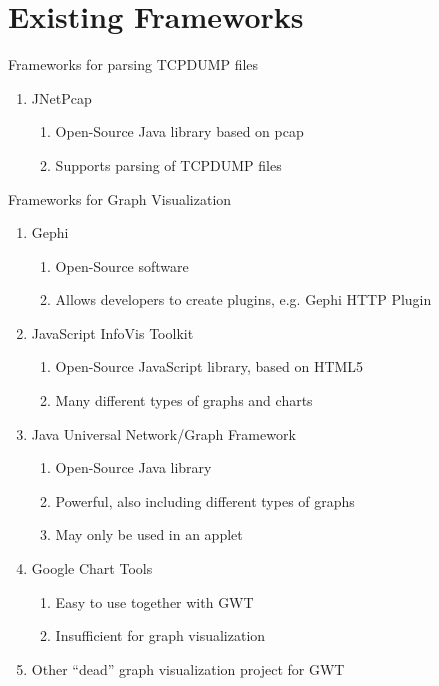 \documentclass{beamer}
\begin{document}
\section{Existing Frameworks}

\begin{frame}{Frameworks for parsing TCPDUMP files }
  \begin{enumerate}
   \item JNetPcap 
      \begin{enumerate}
	\item Open-Source Java library based on pcap
	\item Supports parsing of TCPDUMP files
      \end{enumerate}  
  \end{enumerate}
\end{frame}


\begin{frame}{Frameworks for Graph Visualization}

  \begin{enumerate}
    \item Gephi
      \begin{enumerate}
	\item Open-Source software
	\item Allows developers to create plugins, e.g. Gephi HTTP Plugin
      \end{enumerate}
    \item JavaScript InfoVis Toolkit
      \begin{enumerate}
	\item Open-Source JavaScript library, based on HTML5
	\item Many different types of graphs and charts
      \end{enumerate}
    \item Java Universal Network/Graph Framework
      \begin{enumerate}
	\item Open-Source Java library
	\item Powerful, also including different types of graphs
	\item May only be used in an applet
      \end{enumerate}
    \item Google Chart Tools
      \begin{enumerate}
	\item Easy to use together with GWT
	\item Insufficient for graph visualization
      \end{enumerate}
     \item Other ``dead'' graph visualization project for GWT
 \end{enumerate}
\end{frame}
\end{document}
